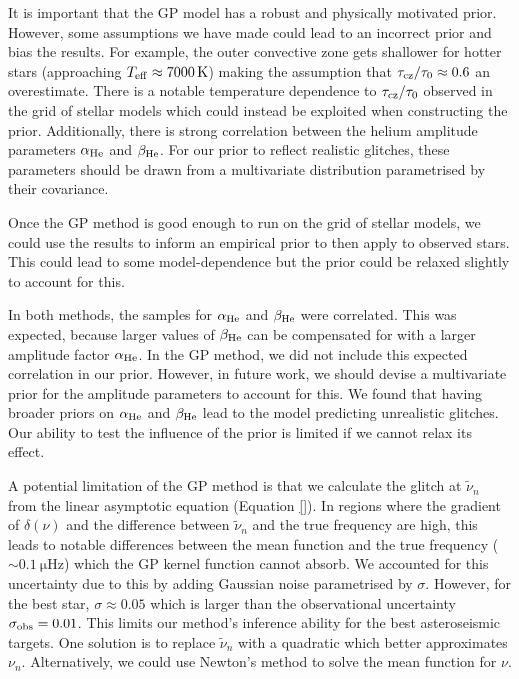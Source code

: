 It is important that the GP model has a robust and physically motivated prior. However, some assumptions we have made could lead to an incorrect prior and bias the results. For example, the outer convective zone gets shallower for hotter stars (approaching \(T_\mathrm{eff} \approx \SI{7000}{\kelvin}\)) making the assumption that \(\tau_{{\mathrm{cz}}}/\tau_0 \approx 0.6\) an overestimate. There is a notable temperature dependence to \(\tau_{{\mathrm{cz}}}/\tau_0\) observed in the grid of stellar models which could instead be exploited when constructing the prior. Additionally, there is strong correlation between the helium amplitude parameters \(\alpha_{{\mathrm{He}}}\) and \(\beta_{{\mathrm{He}}}\). For our prior to reflect realistic glitches, these parameters should be drawn from a multivariate distribution parametrised by their covariance.


Once the GP method is good enough to run on the grid of stellar models, we could use the results to inform an empirical prior to then apply to observed stars. This could lead to some model-dependence but the prior could be relaxed slightly to account for this.

In both methods, the samples for \(\alpha_{{\mathrm{He}}}\) and \(\beta_{{\mathrm{He}}}\) were correlated. This was expected, because larger values of \(\beta_{{\mathrm{He}}}\) can be compensated for with a larger amplitude factor \(\alpha_{{\mathrm{He}}}\). In the GP method, we did not include this expected correlation in our prior. However, in future work, we should devise a multivariate prior for the amplitude parameters to account for this. We found that having broader priors on \(\alpha_{{\mathrm{He}}}\) and \(\beta_{{\mathrm{He}}}\) lead to the model predicting unrealistic glitches. Our ability to test the influence of the prior is limited if we cannot relax its effect.

A potential limitation of the GP method is that we calculate the glitch at \(\tilde{\nu}_n\) from the linear asymptotic equation (Equation \ref{}). In regions where the gradient of \(\delta(\nu)\) and the difference between \(\tilde{\nu}_n\) and the true frequency are high, this leads to notable differences between the mean function and the true frequency (\(\sim \SI{0.1}{\micro\hertz}\)) which the GP kernel function cannot absorb. We accounted for this uncertainty due to this by adding Gaussian noise parametrised by \(\sigma\). However, for the best star, \(\sigma \approx 0.05\) which is larger than the observational uncertainty \(\sigma_{{\mathrm{obs}}} = 0.01\). This limits our method's inference ability for the best asteroseismic targets. One solution is to replace \(\tilde{\nu}_n\) with a quadratic \citep[e.g.][]{Nielsen.Davies.ea2021} which better approximates \(\nu_n\). Alternatively, we could use Newton's method to solve the mean function for \(\nu\).

